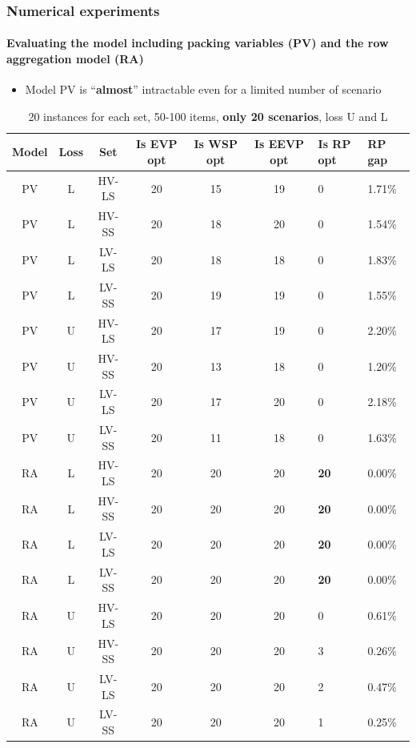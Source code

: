 \documentclass[,9pt,xcolor={dvipsnames}]{beamer} %
\begin{document}
\begin{frame}%
	\frametitle{Numerical experiments}
	\framesubtitle{Evaluating the model including packing variables (PV) and the row aggregation model (RA)}
	\begin{itemize}
		\item Model PV is ``\textbf{almost}'' intractable even for a limited number of scenario
	\end{itemize}
	\bigskip
	\begin{table}[h!]
		\centering
		\footnotesize
		\begin{tabular}{c c c c c c k f}
			\hline
			\textbf{Model} & 
			\textbf{Loss} & 
			\textbf{Set} & 
			\textbf{Is EVP opt} & 
			\textbf{Is WSP opt} & 
			\textbf{Is EEVP opt} &
			\textbf{Is RP opt} & 
			\textbf{RP gap} \\
			\hline
			PV & L & HV-LS & 20 & 15 & 19 & 0 & 1.71\% \\
			PV & L & HV-SS & 20 & 18 & 20 & 0 & 1.54\% \\
			PV & L & LV-LS & 20 & 18 & 18 & 0 & 1.83\% \\
			PV & L & LV-SS & 20 & 19 & 19 & 0 & 1.55\% \\
			\hline
			PV & U & HV-LS & 20 & 17 & 19 & 0 & 2.20\% \\
			PV & U & HV-SS & 20 & 13 & 18 & 0 & 1.20\% \\
			PV & U & LV-LS & 20 & 17 & 20 & 0 & 2.18\% \\
			PV & U & LV-SS & 20 & 11 & 18 & 0 & 1.63\% \\
			\hline
			RA & L & HV-LS & 20 & 20 & 20 & \textbf{20} & 0.00\% \\
			RA & L & HV-SS & 20 & 20 & 20 & \textbf{20} & 0.00\% \\
			RA & L & LV-LS & 20 & 20 & 20 & \textbf{20} & 0.00\% \\
			RA & L & LV-SS & 20 & 20 & 20 & \textbf{20} & 0.00\% \\
			\hline
			RA & U & HV-LS & 20 & 20 & 20 & 0 & 0.61\% \\
			RA & U & HV-SS & 20 & 20 & 20 & 3 & 0.26\% \\
			RA & U & LV-LS & 20 & 20 & 20 & 2 & 0.47\% \\
			RA & U & LV-SS & 20 & 20 & 20 & 1 & 0.25\% \\
			\hline
		\end{tabular}
		\caption{20 instances for each set, 50-100 items, \textbf{only 20 scenarios}, loss U and L}
		\label{tab:optres}
	\end{table}
\end{frame}
\end{document}
